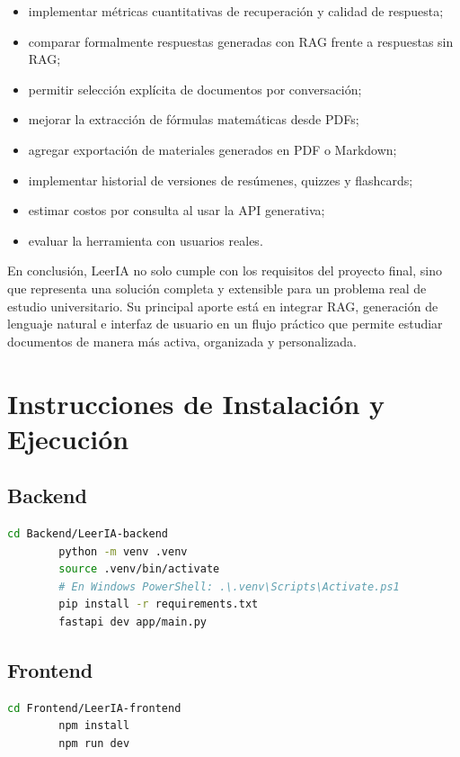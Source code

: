 \documentclass[12pt, letterpaper]{article}
\begin{document}
	\begin{itemize}
		\item implementar métricas cuantitativas de recuperación y calidad de respuesta;
		\item comparar formalmente respuestas generadas con RAG frente a respuestas sin RAG;
		\item permitir selección explícita de documentos por conversación;
		\item mejorar la extracción de fórmulas matemáticas desde PDFs;
		\item agregar exportación de materiales generados en PDF o Markdown;
		\item implementar historial de versiones de resúmenes, quizzes y flashcards;
		\item estimar costos por consulta al usar la API generativa;
		\item evaluar la herramienta con usuarios reales.
	\end{itemize}
	
	En conclusión, LeerIA no solo cumple con los requisitos del proyecto final, sino que representa una solución completa y extensible para un problema real de estudio universitario. Su principal aporte está en integrar RAG, generación de lenguaje natural e interfaz de usuario en un flujo práctico que permite estudiar documentos de manera más activa, organizada y personalizada.
	

	\section{Instrucciones de Instalación y Ejecución}

	
	\subsection{Backend}
	
	\begin{lstlisting}[language=bash]
		cd Backend/LeerIA-backend
		python -m venv .venv
		source .venv/bin/activate
		# En Windows PowerShell: .\.venv\Scripts\Activate.ps1
		pip install -r requirements.txt
		fastapi dev app/main.py
	\end{lstlisting}
	
	\subsection{Frontend}
	
	\begin{lstlisting}[language=bash]
		cd Frontend/LeerIA-frontend
		npm install
		npm run dev
	\end{lstlisting}
	
\end{document}
